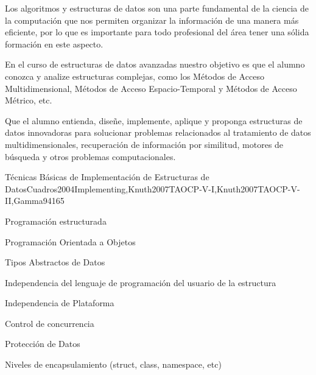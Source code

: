 \begin{syllabus}


\begin{justification}
Los algoritmos y estructuras de datos son una parte fundamental de la ciencia de la computación que nos 
permiten organizar la información de una manera más eficiente, por lo que es importante para todo 
profesional del área tener una sólida formación en este aspecto.

En el curso de estructuras de datos avanzadas nuestro objetivo es que el alumno conozca y analize 
estructuras complejas, como los Métodos de Acceso Multidimensional, 
Métodos de Acceso Espacio-Temporal y 
Métodos de Acceso Métrico, etc.
\end{justification}

\begin{goals}
\item Que el alumno entienda, diseñe, implemente, aplique y
proponga estructuras de datos innovadoras para solucionar
problemas relacionados al tratamiento de datos multidimensionales,
recuperación de información por similitud, motores de búsqueda y
otros problemas computacionales.
\end{goals}

\begin{outcomes}
\end{outcomes}

\begin{unit}{Técnicas Básicas de Implementación de Estructuras de Datos}{Cuadros2004Implementing,Knuth2007TAOCP-V-I,Knuth2007TAOCP-V-II,Gamma94}{16}{5}
   \begin{topics}
         \item Programación estructurada
         \item Programación Orientada a Objetos
         \item Tipos Abstractos de Datos
         \item Independencia del lenguaje de programación del usuario de la estructura
         \item Independencia de Plataforma
         \item Control de concurrencia
         \item Protección de Datos
         \item Niveles de encapsulamiento (struct, class, namespace, etc)
   \end{topics}


\end{unit}
\end{syllabus}
